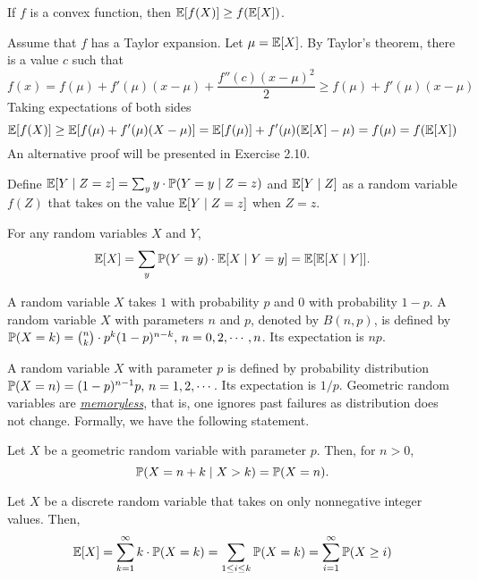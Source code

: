 \documentclass[main.tex]{subfiles}
\begin{document}
\begin{theorem}
	If $f$ is a convex function, then $\mathbb{E}[f(X)]\ge f(\mathbb{E}[X])$.
\end{theorem}

\begin{pf}
	Assume that $f$ has a Taylor expansion. Let $\mu=\mathbb{E}[X]$. By Taylor's theorem, there is a value $c$ such that
	\[
		f(x)=f(\mu)+f'(\mu)(x-\mu)+\frac{f''(c)(x-\mu)^2}{2}\ge f(\mu)+f'(\mu)(x-\mu)
	\]
	Taking expectations of both sides
	\[
		\mathbb{E}[f(X)]\ge\mathbb{E}[f(\mu)+f'(\mu)(X-\mu)]=\mathbb{E}[f(\mu)]+f'(\mu)(\mathbb{E}[X]-\mu)=f(\mu)=f(\mathbb{E}[X])
	\]
	An alternative proof will be presented in Exercise 2.10.
\end{pf}

Define  $\mathbb{E}[Y\mid Z=z]=\sum_{y}y\cdot\mathbb{P}(Y=y\mid Z=z)$ and $\mathbb{E}[Y\mid Z]$ as a random variable $f(Z)$ that takes on the value $\mathbb{E}[Y\mid Z=z]$ when $Z=z$.

\begin{theorem}
	For any random variables $X$ and $Y$, 
	\[
		\mathbb{E}[X]=\sum_y\mathbb{P}(Y=y)\cdot\mathbb{E}[X\mid Y=y]=\mathbb{E}[\mathbb{E}[X\mid Y]].
	\]
\end{theorem}

A  random variable $X$ takes $1$ with probability $p$ and $0$ with probability $1-p$. A  random variable $X$ with parameters $n$ and $p$, denoted by $B(n,p)$, is defined by  $\mathbb{P}(X=k)=\binom{n}{k}\cdot p^k(1-p)^{n-k},\,n=0,2,\cdots,n$. Its expectation is $np$.

A  random variable $X$ with parameter $p$ is defined by probability distribution $\mathbb{P}(X=n) = (1-p)^{n-1}p,\,n=1,2,\cdots$. Its expectation is $1/p$. Geometric random variables are \href{https://en.wikipedia.org/wiki/Memorylessness}{\it memoryless}, that is, one ignores past failures as distribution does not change. Formally, we have the following statement.

\begin{lemma}[Memorylessness] Let $X$ be a geometric random variable with parameter $p$. Then, for $n>0$,
	\[
		\mathbb{P}(X=n+k \mid X > k) = \mathbb{P}(X=n).
	\]
\end{lemma}

\begin{lemma}
	Let $X$ be a discrete random variable that takes on only nonnegative integer values. Then, 
	\[\mathbb{E}[X]=\sum_{k=1}^{\infty}k\cdot \mathbb{P}(X=k) = \sum_{1\le i \le k} \mathbb{P}(X=k)=\sum_{i=1}^{\infty}\mathbb{P}(X \ge i)\]
\end{lemma}
\end{document}
